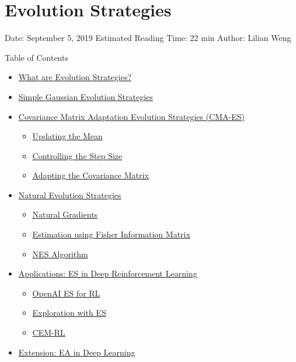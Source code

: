 \section{Evolution Strategies}\label{evolution-strategies}

Date: September 5, 2019 \textbar{} Estimated Reading Time: 22 min \textbar{} Author: Lilian Weng

{Table of Contents}

\begin{itemize}
\tightlist
\item
  \hyperref[what-are-evolution-strategies]{What are Evolution Strategies?}
\item
  \hyperref[simple-gaussian-evolution-strategies]{Simple Gaussian Evolution Strategies}
\item
  \hyperref[covariance-matrix-adaptation-evolution-strategies-cma-es]{Covariance Matrix Adaptation Evolution Strategies (CMA-ES)}

  \begin{itemize}
  \tightlist
  \item
    \hyperref[updating-the-mean]{Updating the Mean}
  \item
    \hyperref[controlling-the-step-size]{Controlling the Step Size}
  \item
    \hyperref[adapting-the-covariance-matrix]{Adapting the Covariance Matrix}
  \end{itemize}
\item
  \hyperref[natural-evolution-strategies]{Natural Evolution Strategies}

  \begin{itemize}
  \tightlist
  \item
    \hyperref[natural-gradients]{Natural Gradients}
  \item
    \hyperref[estimation-using-fisher-information-matrix]{Estimation using Fisher Information Matrix}
  \item
    \hyperref[nes-algorithm]{NES Algorithm}
  \end{itemize}
\item
  \hyperref[applications-es-in-deep-reinforcement-learning]{Applications: ES in Deep Reinforcement Learning}

  \begin{itemize}
  \tightlist
  \item
    \hyperref[openai-es-for-rl]{OpenAI ES for RL}
  \item
    \hyperref[exploration-with-es]{Exploration with ES}
  \item
    \hyperref[cem-rl]{CEM-RL}
  \end{itemize}
\item
  \hyperref[extension-ea-in-deep-learning]{Extension: EA in Deep Learning}


\end{itemize}
